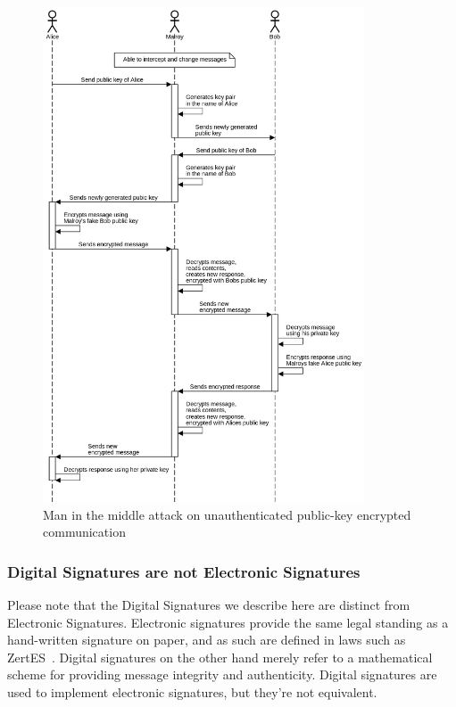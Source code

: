 \begin{figure}
    \centering
    \includegraphics[width=0.85\textwidth]{images/pubkey_midm.png}
    \caption{Man in the middle attack on unauthenticated public-key encrypted communication}
    \label{fig:pubkeymidm}
\end{figure}

\subsubsection{Digital Signatures are not Electronic Signatures}
Please note that the Digital Signatures we describe here are distinct from Electronic Signatures.
Electronic signatures provide the same legal standing as a hand-written signature on paper,
and as such are defined in laws such as ZertES~\cite{zertes}.
Digital signatures on the other hand merely refer to a mathematical scheme for providing message integrity and authenticity.
Digital signatures are used to implement electronic signatures, but they're not equivalent.


